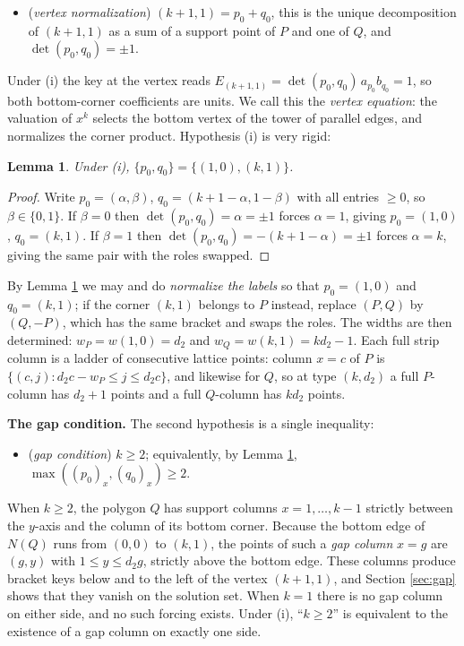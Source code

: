 \documentclass[11pt]{article}
\newtheorem{lemma}[theorem]{Lemma}
\theoremstyle{definition}
\theoremstyle{remark}
\begin{document}
\begin{itemize}
\item[(i)] (\emph{vertex normalization}) $(k+1,1)=p_0+q_0$, this is the unique decomposition of $(k+1,1)$ as a sum of a support point of $P$ and one of $Q$, and $\det(p_0,q_0)=\pm 1$.
\end{itemize}

Under (i) the key at the vertex reads $E_{(k+1,1)}=\det(p_0,q_0)\,a_{p_0}b_{q_0}=1$, so both bottom-corner coefficients are units. We call this the \emph{vertex equation}: the valuation of $x^k$ selects the bottom vertex of the tower of parallel edges, and normalizes the corner product. Hypothesis (i) is very rigid:

\begin{lemma}\label{lem:enum}
Under (i), $\{p_0,q_0\}=\{(1,0),(k,1)\}$.
\end{lemma}

\begin{proof}
Write $p_0=(\alpha,\beta)$, $q_0=(k+1-\alpha,1-\beta)$ with all entries $\geq 0$, so $\beta\in\{0,1\}$. If $\beta=0$ then $\det(p_0,q_0)=\alpha=\pm1$ forces $\alpha=1$, giving $p_0=(1,0)$, $q_0=(k,1)$. If $\beta=1$ then $\det(p_0,q_0)=-(k+1-\alpha)=\pm 1$ forces $\alpha=k$, giving the same pair with the roles swapped.
\end{proof}

By Lemma \ref{lem:enum} we may and do \emph{normalize the labels} so that $p_0=(1,0)$ and $q_0=(k,1)$; if the corner $(k,1)$ belongs to $P$ instead, replace $(P,Q)$ by $(Q,-P)$, which has the same bracket and swaps the roles. The widths are then determined: $w_P=w(1,0)=d_2$ and $w_Q=w(k,1)=kd_2-1$. Each full strip column is a ladder of consecutive lattice points: column $x=c$ of $P$ is $\{(c,j): d_2c-w_P\leq j\leq d_2c\}$, and likewise for $Q$, so at type $(k,d_2)$ a full $P$-column has $d_2+1$ points and a full $Q$-column has $kd_2$ points.

\medskip
\noindent\textbf{The gap condition.} The second hypothesis is a single inequality:
\begin{itemize}
\item[(ii)] (\emph{gap condition}) $k\geq 2$; equivalently, by Lemma \ref{lem:enum}, $\max((p_0)_x,(q_0)_x)\geq 2$.
\end{itemize}
When $k\geq 2$, the polygon $Q$ has support columns $x=1,\dots,k-1$ strictly between the $y$-axis and the column of its bottom corner. Because the bottom edge of $N(Q)$ runs from $(0,0)$ to $(k,1)$, the points of such a \emph{gap column} $x=g$ are $(g,y)$ with $1\leq y\leq d_2g$, strictly above the bottom edge. These columns produce bracket keys below and to the left of the vertex $(k+1,1)$, and Section \ref{sec:gap} shows that they vanish on the solution set. When $k=1$ there is no gap column on either side, and no such forcing exists. Under (i), ``$k\geq 2$'' is equivalent to the existence of a gap column on exactly one side.
\end{document}
